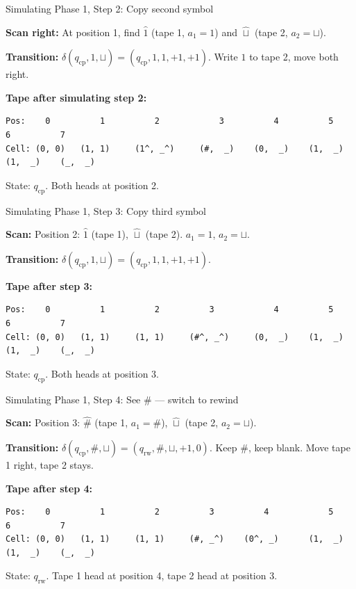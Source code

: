 \documentclass[11pt,a4paper]{article}
\begin{document}
\begin{examplebox}{{Simulating Phase 1, Step 2: Copy second symbol}}

\textbf{Scan right:} At position 1, find $\hat{1}$ (tape 1, $a_1 = 1$) and $\hat{\sqcup}$ (tape 2, $a_2 = \sqcup$).

\textbf{Transition:} $\delta(q_{\text{cp}}, 1, \sqcup) = (q_{\text{cp}}, 1, 1, +1, +1)$. Write $1$ to tape 2, move both right.

\textbf{Tape after simulating step 2:}
\begin{lstlisting}
Pos:    0          1          2            3          4          5          6          7
Cell: (0, 0)   (1, 1)     (1^, _^)     (#,  _)    (0,  _)    (1,  _)    (1,  _)    (_,  _)
\end{lstlisting}
State: $q_{\text{cp}}$. Both heads at position 2.
\end{examplebox}

\begin{examplebox}{{Simulating Phase 1, Step 3: Copy third symbol}}

\textbf{Scan:} Position 2: $\hat{1}$ (tape 1), $\hat{\sqcup}$ (tape 2). $a_1 = 1$, $a_2 = \sqcup$.

\textbf{Transition:} $\delta(q_{\text{cp}}, 1, \sqcup) = (q_{\text{cp}}, 1, 1, +1, +1)$.

\textbf{Tape after step 3:}
\begin{lstlisting}
Pos:    0          1          2          3            4          5          6          7
Cell: (0, 0)   (1, 1)     (1, 1)     (#^, _^)     (0,  _)    (1,  _)    (1,  _)    (_,  _)
\end{lstlisting}
State: $q_{\text{cp}}$. Both heads at position 3.
\end{examplebox}

\begin{examplebox}{{Simulating Phase 1, Step 4: See \# --- switch to rewind}}

\textbf{Scan:} Position 3: $\hat{\#}$ (tape 1, $a_1 = \#$), $\hat{\sqcup}$ (tape 2, $a_2 = \sqcup$).

\textbf{Transition:} $\delta(q_{\text{cp}}, \#, \sqcup) = (q_{\text{rw}}, \#, \sqcup, +1, 0)$. Keep \#, keep blank. Move tape 1 right, tape 2 stays.

\textbf{Tape after step 4:}
\begin{lstlisting}
Pos:    0          1          2          3          4            5          6          7
Cell: (0, 0)   (1, 1)     (1, 1)     (#, _^)    (0^, _)      (1,  _)    (1,  _)    (_,  _)
\end{lstlisting}
State: $q_{\text{rw}}$. Tape 1 head at position 4, tape 2 head at position 3.
\end{examplebox}
\end{document}
